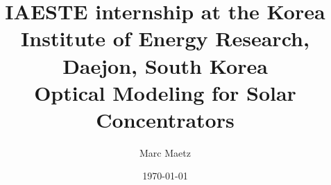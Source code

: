 \documentclass[12pt,a4paper,twoside,twocolumn,article]{memoir}
\title{\LARGE IAESTE internship at the Korea Institute of Energy Research, Daejon, South Korea\\ \vspace{2em} \HUGE Optical Modeling for Solar Concentrators
}
\author{
	Marc Maetz}
\date{\Large\vspace{2em}\today}
\begin{document}
 

\begin{titlingpage}
\maketitle
\end{titlingpage}
\nopagebreak[0]






\end{document}
